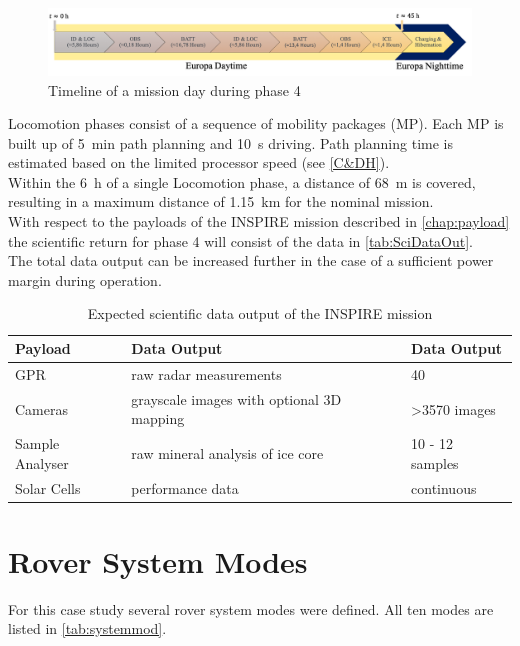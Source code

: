 \begin{figure}[htb]
  \includegraphics[width=1.0\textwidth]{Media/Timeline_day.png}
  \caption{Timeline of a mission day during phase 4}
  \label{fig:timeline-day}
\end{figure}


Locomotion phases consist of a sequence of mobility packages (MP). Each MP is built up of 5~min path planning and 10~s driving. Path planning time is estimated based on the limited processor speed (see \autoref{C&DH}). \\
Within the 6~h of a single Locomotion phase, a distance of 68~m is covered, resulting in a maximum distance of 1.15~km for the nominal mission.  \\

With respect to the payloads of the INSPIRE mission described in \autoref{chap:payload} the scientific return for phase 4 will consist of the data in \autoref{tab:SciDataOut}. \\
The total data output can be increased further in the case of a sufficient power margin during operation.

\begin{table}[h]
\centering
\caption{Expected scientific data output of the INSPIRE mission }
\begin{tabular}{lll}
\toprule
Payload         & Data Output                               & Data Output     \\ 
\midrule
GPR             & raw radar measurements                    & 40              \\
Cameras         & grayscale images with optional 3D mapping & >3570 images     \\
Sample Analyser & raw mineral analysis of ice core          & 10 - 12 samples \\
Solar Cells     & performance data                          & continuous      \\ 
\bottomrule
\end{tabular}
\label{tab:SciDataOut}
\end{table}

  
\section{Rover System Modes}
\label{chap:rovsubmod}
For this case study several rover system modes were defined. All ten modes are listed in \autoref{tab:systemmod}. 

